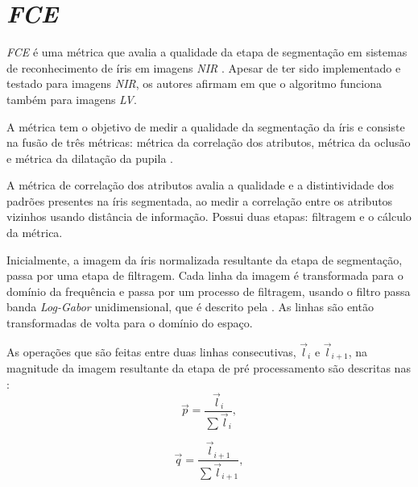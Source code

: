 
\section{\textit{\acrfull{FCE}}} \label{sec:revisao:fce}

\par \textit{\acrfull{FCE}} é uma métrica que avalia a qualidade da etapa de segmentação em sistemas de reconhecimento de íris em imagens \textit{\acrfull{NIR}} \cite{du2010}. Apesar de ter sido implementado e testado para imagens \textit{\acrshort{NIR}}, os autores afirmam em \cite{zhou2012} que o algoritmo funciona também para imagens \textit{\acrshort{LV}}. 

\par A métrica tem o objetivo de medir a qualidade da segmentação da íris e consiste na fusão de três métricas: métrica da correlação dos atributos, métrica da oclusão e métrica da dilatação da pupila \cite{du2010}.

\par A métrica de correlação dos atributos avalia a qualidade e a distintividade dos padrões presentes na íris segmentada, ao medir a correlação entre os atributos vizinhos usando distância de informação. Possui duas etapas: filtragem e o cálculo da métrica.

\par Inicialmente, a imagem da íris normalizada resultante da etapa de segmentação, passa por uma etapa de filtragem. Cada linha da imagem é transformada para o domínio da frequência e passa por um processo de filtragem, usando o filtro passa banda \textit{Log-Gabor} unidimensional, que é descrito pela . As linhas são então transformadas de volta para o domínio do espaço.


\par As operações que são feitas entre duas linhas consecutivas, $\vec{l}_{i}$ e $\vec{l}_{i+1}$, na magnitude da imagem resultante da etapa de pré processamento são descritas nas  \cite{du2010}:
\begin{equation} \label{eq:fce:fcm1}
    \vec{p} = \frac{\vec{l}_{i}}{\sum\vec{l}_{i}},
\end{equation}

\begin{equation} \label{eq:fce:fcm2}
    \vec{q} = \frac{\vec{l}_{i+1}}{\sum\vec{l}_{i+1}},
\end{equation}


